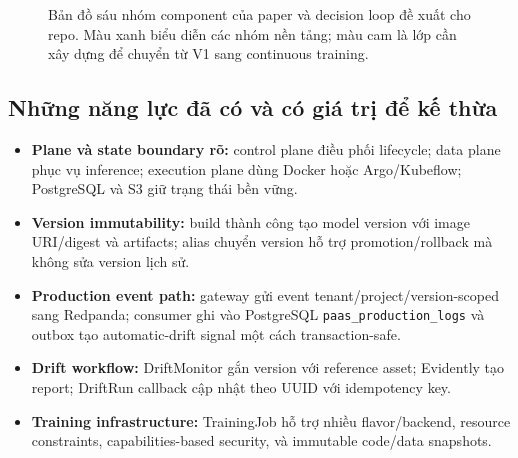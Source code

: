 \documentclass[11pt,a4paper]{article}
\newcommand{\codepath}[1]{\texttt{\small #1}}
\begin{document}
\begin{figure}[ht]
\caption{Bản đồ sáu nhóm component của paper và decision loop đề xuất cho repo. Màu xanh biểu diễn các nhóm nền tảng; màu cam là lớp cần xây dựng để chuyển từ V1 sang continuous training.}
\label{fig:component-map}
\end{figure}

\subsection{Những năng lực đã có và có giá trị để kế thừa}
\begin{itemize}
  \item \textbf{Plane và state boundary rõ:} control plane điều phối lifecycle; data plane phục vụ inference; execution plane dùng Docker hoặc Argo/Kubeflow; PostgreSQL và S3 giữ trạng thái bền vững.
  \item \textbf{Version immutability:} build thành công tạo model version với image URI/digest và artifacts; alias chuyển version hỗ trợ promotion/rollback mà không sửa version lịch sử.
  \item \textbf{Production event path:} gateway gửi event tenant/project/version-scoped sang Redpanda; consumer ghi vào PostgreSQL \codepath{paas\_production\_logs} và outbox tạo automatic-drift signal một cách transaction-safe.
  \item \textbf{Drift workflow:} DriftMonitor gắn version với reference asset; Evidently tạo report; DriftRun callback cập nhật theo UUID với idempotency key.
  \item \textbf{Training infrastructure:} TrainingJob hỗ trợ nhiều flavor/backend, resource constraints, capabilities-based security, và immutable code/data snapshots.
\end{itemize}
\end{document}
